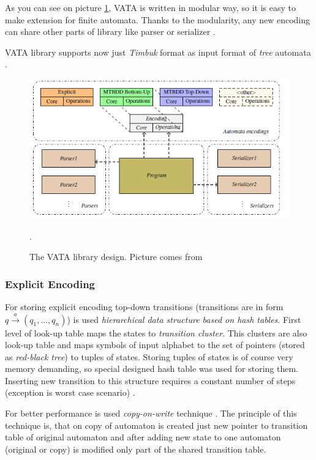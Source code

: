 As you
can see on picture \ref{picVataDesign}, VATA is written in modular way, so it is easy to make extension for finite automata. Thanks to the modularity, 
any new encoding can share other parts of library like parser or serializer \cite{libvata}.

VATA library supports now just \emph{Timbuk} format as input format of \emph{tree} automata \cite{timbuk}.

\begin{figure}[h]
	\begin{center}
		\scalebox{0.6}
		{
			\includegraphics{fig/vata_design.png}
		}
		\caption{The VATA library design. Picture comes from \cite{libvata}}.
		\label{picVataDesign}
	\end{center}
\end{figure}

\subsubsection{Explicit Encoding}
\label{sectionExplicitEnc}
For storing explicit encoding top-down transitions (transitions are in form $q \xrightarrow{a} (q_1,...,q_n)$) 
is used \emph{hierarchical data structure based on hash tables}. First level of look-up
table maps the states to \emph{transition cluster}. This clusters are also look-up table and maps symbols of input alphabet
to the set of pointers (stored as \emph{red-black tree}) to tuples of states. Storing tuples of states is of course very memory demanding, so special
designed hash table was used for storing them. Inserting new transition to this structure requires a constant number of steps (exception is worst case scenario)
\cite{libvata}. 

For better performance is used \emph{copy-on-write} technique \cite{libvata}. The principle of this technique is, 
that on copy of automaton is created just new pointer to transition table of original automaton and after adding new state to one automaton (original or
copy) is modified only part of the shared transition table. 
